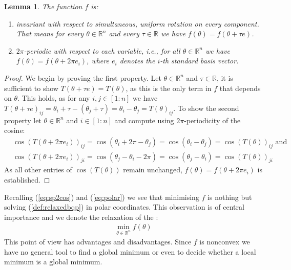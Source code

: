 \documentclass[12pt,a4paper]{article}
\theoremstyle{mythm}
\newtheorem{lem}[thm]{Lemma}
\begin{document}
\begin{lem}
\label{prop:propertiesf} 
The function $ f $ is:
\begin{enumerate}
\item 
invariant with respect to simultaneous, uniform rotation on every component. That means for every $ \theta \in \mathbb{R} ^{ n }  $ and every  $ \tau \in \mathbb{R}  $ we have $ f (\theta) = f (\theta + \tau e) $.
\item $ 2 \pi  $-periodic with respect to each variable, i.e., for all $ \theta \in \mathbb{R} ^{ n }  $ we have $ f ( \theta ) = f ( \theta + 2 \pi e_i)  $, where $ e_i $
denotes the $ i $-th standard basis vector.
\end{enumerate}
\end{lem} 
\begin{proof}
We begin by proving the first property. Let $ \theta \in \mathbb{R} ^{ n }  $ and $ \tau \in \mathbb{R}  $, it is sufficient to show $ T ( \theta + \tau e) = T ( \theta) $,
as this is the only term in $ f $ that depends on $ \theta $.
This holds, as for any $ i,j \in \left[ 1:n \right]  $ we have $T ( \theta + \tau e) _{ ij } =  \theta _{ i } + \tau - ( \theta _{ j } + \tau ) = \theta _{ i } - \theta _{ j } = T(
\theta) _{ ij }  $.
To show the second property let $ \theta \in \mathbb{R} ^{ n }  $ and $ i \in \left[ 1:n \right]  $ and compute using $ 2 \pi  $-periodicity of the cosine:
\begin{align*}
&\cos(   T ( \theta + 2 \pi e_i) )_{ ij } =  \cos( \theta_i + 2 \pi - \theta_j ) = \cos( \theta_i - \theta_j ) = \cos( T (\theta) ) _{ ij } \text{ and} \\
&\cos(   T ( \theta + 2 \pi e_i) )_{ ji } =  \cos( \theta_j - \theta_i - 2 \pi ) = \cos( \theta_j - \theta_i ) = \cos( T (\theta) ) _{ ji }
\end{align*} 
As all other entries of $ \cos( T(\theta) )   $ remain unchanged, $ f(\theta) = f(\theta+2\pi e_i) $ is established.
\end{proof}
Recalling (\ref{eq:sp2cos}) and (\ref{eq:polar}) we see that minimising $ f $ is nothing but solving (\ref{def:relaxedbqp}) in polar coordinates.
This observation is of central importance and we denote the relaxation of the \MCP:
\begin{align}
\label{def:minf}
\min_{\theta \in \mathbb{R} ^{ n } } f(\theta)
\end{align} 
This point of view has advantages and disadvantages.
Since $ f $ is nonconvex we have no general tool to find a global minimum or even to decide whether a local minimum is a global minimum.
\end{document}
